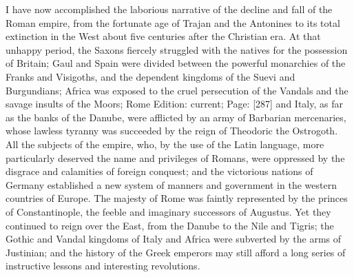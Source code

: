 I have now accomplished the laborious narrative of the decline and fall of the Roman empire, from the fortunate age of Trajan and the Antonines to its total extinction in the West about five centuries after the Christian era. At that unhappy period, the Saxons fiercely struggled with the natives for the possession of Britain; Gaul and Spain were divided between the powerful monarchies of the Franks and Visigoths, and the dependent kingdoms of the Suevi and Burgundians; Africa was exposed to the cruel persecution of the Vandals and the savage insults of the Moors; Rome Edition: current; Page: [287] and Italy, as far as the banks of the Danube, were afflicted by an army of Barbarian mercenaries, whose lawless tyranny was succeeded by the reign of Theodoric the Ostrogoth. All the subjects of the empire, who, by the use of the Latin language, more particularly deserved the name and privileges of Romans, were oppressed by the disgrace and calamities of foreign conquest; and the victorious nations of Germany established a new system of manners and government in the western countries of Europe. The majesty of Rome was faintly represented by the princes of Constantinople, the feeble and imaginary successors of Augustus. Yet they continued to reign over the East, from the Danube to the Nile and Tigris; the Gothic and Vandal kingdoms of Italy and Africa were subverted by the arms of Justinian; and the history of the Greek emperors may still afford a long series of instructive lessons and interesting revolutions.


